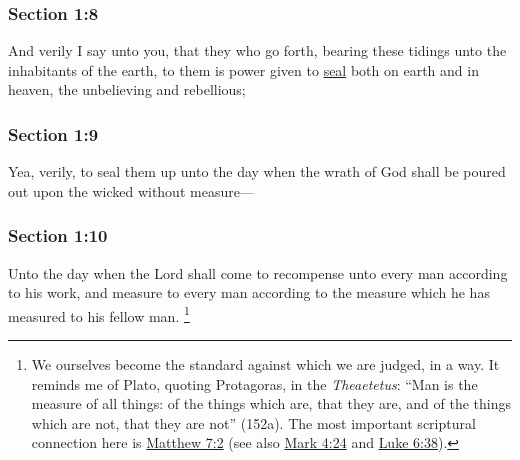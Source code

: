 	\subsubsection{Section 1:8} %
		\label{DC1-8}

		And verily I say unto you, that they who go forth, bearing these tidings unto the inhabitants of the earth, to them is power given to \hyperref[SEAL]{seal} both on earth and in heaven, the unbelieving and rebellious;


	\subsubsection{Section 1:9} %
		\label{DC1-9}

		Yea, verily, to seal them up unto the day when the wrath of God shall be poured out upon the wicked without measure---


	\subsubsection{Section 1:10} %
		\label{DC1-10}

		Unto the day when the Lord shall come to recompense unto every man according to his work, and measure to every man according to the measure which he has measured to his fellow man.%
			\footnote{%
				We ourselves become the standard against which we are judged, in a way. It reminds me of Plato, quoting Protagoras, in the \textit{Theaetetus}: ``Man is the measure of all things: of the things which are, that they are, and of the things which are not, that they are not'' (152a). The most important scriptural connection here is \hyperref[MATTHEW-7-2]{Matthew 7:2} (see also \hyperref[MARK-4-24]{Mark 4:24} and \hyperref[LUKE-6-38]{Luke 6:38}).
				}

